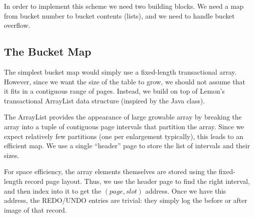 \documentclass[10pt,letterpaper,twocolumn,english]{article}
\newcommand{\yad}{Lemon\xspace}
\newcommand{\rcs}[1]{\textcolor{green}{\bf RCS: #1}}
\begin{document}
In order to implement this scheme we need two building blocks.  We
need a map from bucket number to bucket contents (lists), and we need to handle bucket overflow.


\subsection{The Bucket Map}

The simplest bucket map would simply use a fixed-length transactional
array. However, since we want the size of the table to grow, we should
not assume that it fits in a contiguous range of pages. Instead, we build
on top of \yad's transactional ArrayList data structure (inspired by
the Java class).

The ArrayList provides the appearance of large growable array by
breaking the array into a tuple of contiguous page intervals that
partition the array.  Since we expect relatively few partitions (one
per enlargement typically), this leads to an efficient map. We use a
single ``header'' page to store the list of intervals and their sizes.

For space efficiency, the array elements themselves are stored using
the fixed-length record page layout. Thus, we use the header page to
find the right interval, and then index into it to get the $(page,
slot)$ address.  Once we have this address, the REDO/UNDO entries are
trivial: they simply log the before or after image of that record.




\end{document}

